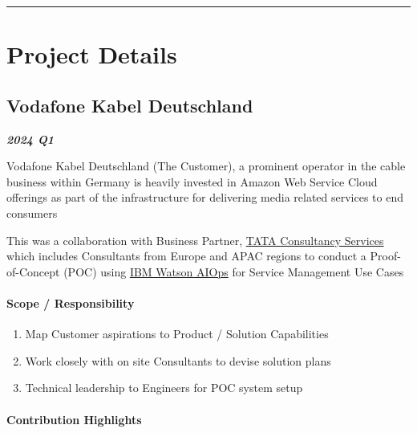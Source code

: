 \documentclass[
]{article}
\providecommand{\tightlist}{%
  \setlength{\itemsep}{0pt}\setlength{\parskip}{0pt}}
\begin{document}
\begin{center}\rule{0.5\linewidth}{0.5pt}\end{center}

\hypertarget{project-details}{%
\section{Project Details}\label{project-details}}

\hypertarget{vodafone-kabel-deutschland}{%
\subsection{Vodafone Kabel
Deutschland}\label{vodafone-kabel-deutschland}}

\textbf{\emph{2024 Q1}}

Vodafone Kabel Deutschland (The Customer), a prominent operator in the
cable business within Germany is heavily invested in Amazon Web Service
Cloud offerings as part of the infrastructure for delivering media
related services to end consumers

This was a collaboration with Business Partner,
\href{https://www.tcs.com/}{TATA Consultancy Services} which includes
Consultants from Europe and APAC regions to conduct a Proof-of-Concept
(POC) using \href{https://www.ibm.com/watson/aiops-overview/}{IBM Watson
AIOps} for Service Management Use Cases

\hypertarget{scope-responsibility}{%
\paragraph{Scope / Responsibility}\label{scope-responsibility}}

\begin{enumerate}
\def\labelenumi{\arabic{enumi}.}
\tightlist
\item
  Map Customer aspirations to Product / Solution Capabilities
\item
  Work closely with on site Consultants to devise solution plans
\item
  Technical leadership to Engineers for POC system setup
\end{enumerate}

\hypertarget{contribution-highlights}{%
\paragraph{Contribution Highlights}\label{contribution-highlights}}
\end{document}
